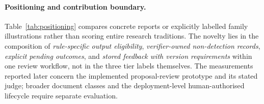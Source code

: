 \documentclass[computers,article,submit,moreauthors]{Definitions/mdpi}
\begin{document}
\paragraph{Positioning and contribution boundary.}
Table~\ref{tab:positioning} compares concrete reports or explicitly labelled family illustrations rather than scoring entire research traditions. The novelty lies in the composition of \emph{rule-specific output eligibility}, \emph{verifier-owned non-detection records}, \emph{explicit pending outcomes}, and \emph{stored feedback with version requirements} within one review workflow, not in the three tier labels themselves. The measurements reported later concern the implemented proposal-review prototype and its stated judge; broader document classes and the deployment-level human-authorised lifecycle require separate evaluation.
\end{document}
